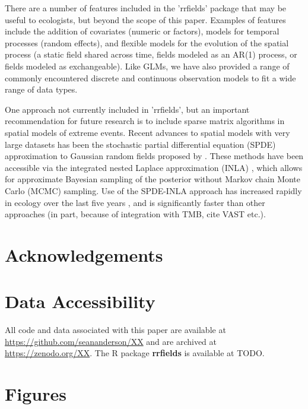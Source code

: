 \documentclass[12pt,english]{article}
\begin{document}
\begin{spacing}{1.25}
There are a number of features included in the 'rrfields' package that may be
useful to ecologists, but beyond the scope of this paper. Examples of features
include the addition of covariates (numeric or factors), models for temporal
processes (random effects), and flexible models for the evolution of the spatial
process (a static field shared across time, fields modeled as an AR(1) process,
or fields modeled as exchangeable). Like GLMs, we have also provided a range of
commonly encountered discrete and continuous observation models to fit a wide
range of data types.

One approach not currently included in 'rrfields', but an important recommendation
for future research is to include sparse matrix algorithms in spatial models of
extreme events. Recent advances to spatial models with very large datasets has
been the stochastic partial differential equation (SPDE)  approximation to
Gaussian random fields proposed by \citet{lindgren2011}. These methods have
been accessible via the integrated nested Laplace approximation (INLA)
\citep{rue2009}, which allows for approximate Bayesian sampling of the posterior
without Markov chain Monte Carlo (MCMC) sampling. Use of the SPDE-INLA approach has
increased rapidly in ecology over the last five years \citep[e.g.][]{illian2013, ono2016},
and is significantly faster than other approaches (in part, because of integration with
TMB, cite VAST etc.).

\section{Acknowledgements}

\section{Data Accessibility}

All code and data associated with this paper are available at
\url{https://github.com/seananderson/XX} and are archived at
\url{https://zenodo.org/XX}.
The R package \textbf{rrfields} is available at TODO.

\section{Figures}


\end{spacing}
\end{document}
